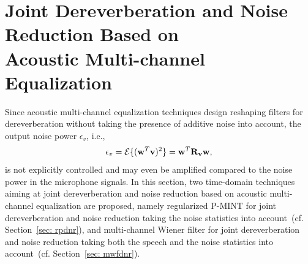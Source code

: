 \documentclass[draftcls,onecolumn,11pt]{IEEEtran}
\begin{document}
\section{Joint Dereverberation and Noise Reduction Based on \\ Acoustic Multi-channel Equalization}
\label{sec: nr}
Since acoustic multi-channel equalization techniques design reshaping filters for dereverberation without taking the presence of additive noise into account, the output noise power $\epsilon_{v}$, i.e., 
\begin{equation}
\label{eq: np}
\epsilon_v = {\cal{E}} \{(\mathbf{w}^T \mathbf{v})^2 \} = \mathbf{w}^T \mathbf{R}_{\mathbf{v}}\mathbf{w},
\end{equation}
is not explicitly controlled and may even be amplified compared to the noise power in the microphone signals.
In this section, two time-domain techniques aiming at joint dereverberation and noise reduction based on acoustic multi-channel equalization are proposed, namely regularized P-MINT for joint dereverberation and noise reduction taking the noise statistics into account~(cf. Section~\ref{sec: rpdnr}), and multi-channel Wiener filter for joint dereverberation and noise reduction taking both the speech and the noise statistics into account~(cf. Section~\ref{sec: mwfdnr}).
\end{document}
